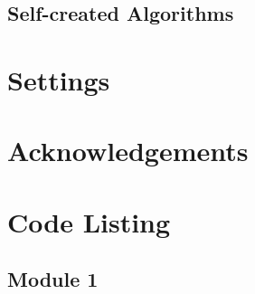 \subsection{Self-created Algorithms}

\section{Settings}

\section{Acknowledgements}

\section{Code Listing}
\begin{landscape}
\subsection{Module 1}
\begin{comment}
\pythonfile[firstline=5]{./tex/function_programs/print_function.py}
\end{comment}
\end{landscape}


